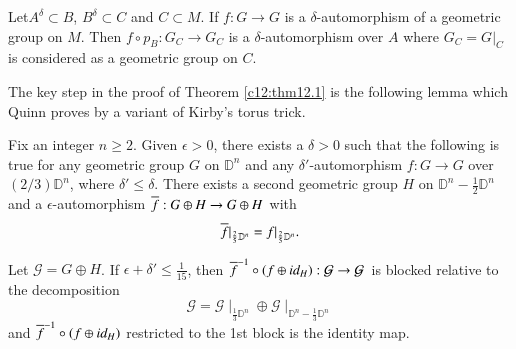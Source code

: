 \begin{lemma}\label{c12:lem12.3}
  Let\pageoriginale $A^\delta \subset B$, $B^\delta \subset C$ and $C \subset M$. If
  $f: G \to G$ is a $\delta$-automorphism of a geometric group on
  $M$. Then $f \circ p_B: G_C \to G_C$ is a $\delta$-automorphism over
  $A$ where $G_C=G|_C$ is considered as a geometric group on $C$.
\end{lemma}

The key step in the proof of Theorem \ref{c12:thm12.1} is the
following lemma which Quinn proves by a variant of Kirby's torus
trick.

\begin{lemma}\label{c12:lem12.4}
  Fix an integer $n \geq 2$. Given $\epsilon > 0$, there exists a
  $\delta> 0$ such that the following is true for any geometric group
  $G$ on $\mathbb{D}^{n}$ and any $\delta'$-automorphism $f:G\to G$
  over $(2/3)\mathbb{D}^{n}$, where $\delta'\leq \delta$. There exists
  a second geometric group
  $H$ on $\mathbb{D}^n - \frac{1}{2} \mathbb{D}^n$ and a
  $\epsilon$-automorphism $\overline{f}: G \oplus H \to G \oplus H$ with
  $$
  \overline{f} |_{\frac{2}{5}\mathbb{D}^n}= f|_{\frac{2}{5}\mathbb{D}^n}.
  $$
\end{lemma}

\begin{rem}\label{c12:rem12.5}
  Let $\mathcal{G}=G \oplus H$. If $\epsilon + \delta' \leq
  \frac{1}{15}$, then $\overline{f}^{-1}\circ(f \oplus id_H): \mathcal{G}
  \to \mathcal{G}$ is blocked relative to the decomposition
  $$
  \mathcal{G} = \mathcal{G}\mid_{\frac{1}{3}\mathbb{D}^n} \oplus
  \mathcal{G}\mid_{\mathbb{D}^n- \frac{1}{3} \mathbb{D}^n} 
  $$
  and $\overline{f}^{-1} \circ (f \oplus id_{H})$ restricted to the 1st
  block is the identity map.
\end{rem}

\begin{figure}[H]
\end{figure}

